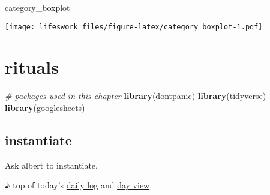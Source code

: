 \documentclass[]{book}
\newenvironment{Shaded}{\begin{snugshade}}{\end{snugshade}}
\newcommand{\CommentTok}[1]{\textcolor[rgb]{0.56,0.35,0.01}{\textit{#1}}}
\newcommand{\KeywordTok}[1]{\textcolor[rgb]{0.13,0.29,0.53}{\textbf{#1}}}
\newcommand{\NormalTok}[1]{#1}
\newcommand{\OperatorTok}[1]{\textcolor[rgb]{0.81,0.36,0.00}{\textbf{#1}}}
\newcommand{\StringTok}[1]{\textcolor[rgb]{0.31,0.60,0.02}{#1}}
\begin{document}
\begin{Shaded}
\begin{Highlighting}[]
\NormalTok{category_boxplot}
\end{Highlighting}
\end{Shaded}

\texttt{[image: lifeswork\_files/figure-latex/category boxplot-1.pdf]}

\hypertarget{rituals}{%
\chapter{rituals}\label{rituals}}

\begin{Shaded}
\begin{Highlighting}[]
\CommentTok{# packages used in this chapter}
\KeywordTok{library}\NormalTok{(dontpanic)}
\KeywordTok{library}\NormalTok{(tidyverse)}
\KeywordTok{library}\NormalTok{(googlesheets)}
\end{Highlighting}
\end{Shaded}

\begin{Shaded}
\end{Shaded}

\hypertarget{instantiate}{%
\section{instantiate}\label{instantiate}}

Ask albert to instantiate.

♪ top of today's \protect\hyperlink{daily-log}{daily log} and \protect\hyperlink{dayview:day-view}{day view}.
\end{document}
